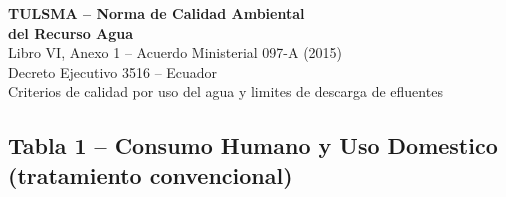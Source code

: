 \documentclass[12pt,a4paper]{article}
\begin{document}
\begin{center}
{\LARGE\bfseries TULSMA -- Norma de Calidad Ambiental\\[4pt]
del Recurso Agua}\\[8pt]
{\large Libro VI, Anexo 1 -- Acuerdo Ministerial 097-A (2015)\\
Decreto Ejecutivo 3516 -- Ecuador}\\[4pt]
{\small Criterios de calidad por uso del agua y limites de descarga de efluentes}
\end{center}
\vspace{10pt}

\subsection{Tabla 1 -- Consumo Humano y Uso Domestico (tratamiento convencional)}
\small
\end{document}
